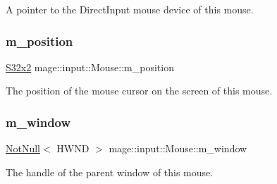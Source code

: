 A pointer to the Direct\+Input mouse device of this mouse. \mbox{\label{classmage_1_1input_1_1_mouse_a240e60291f97e6b281d11cfd52d38e53}} 
\subsubsection{\texorpdfstring{m\+\_\+position}{m\_position}}
{\footnotesize\ttfamily \mbox{\hyperlink{namespacemage_a4843c424aae7bb5fb6c440ed6ed593ee}{S32x2}} mage\+::input\+::\+Mouse\+::m\+\_\+position\hspace{0.3cm}{\ttfamily [private]}}

The position of the mouse cursor on the screen of this mouse. \mbox{\label{classmage_1_1input_1_1_mouse_a9fc088bd15bc89c9791642e4a95e81bc}} 
\subsubsection{\texorpdfstring{m\+\_\+window}{m\_window}}
{\footnotesize\ttfamily \mbox{\hyperlink{namespacemage_a8769f9d670d6b585ea306cb1062af94b}{Not\+Null}}$<$ H\+W\+ND $>$ mage\+::input\+::\+Mouse\+::m\+\_\+window\hspace{0.3cm}{\ttfamily [private]}}

The handle of the parent window of this mouse. 